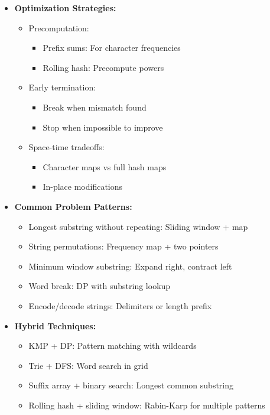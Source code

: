 \documentclass[a4paper,10pt]{book}
\begin{document}
\begin{itemize}
    \item \textbf{Optimization Strategies:}
    \begin{itemize}
        \item Precomputation:
        \begin{itemize}
            \item Prefix sums: For character frequencies
            \item Rolling hash: Precompute powers
        \end{itemize}
        \item Early termination:
        \begin{itemize}
            \item Break when mismatch found
            \item Stop when impossible to improve
        \end{itemize}
        \item Space-time tradeoffs:
        \begin{itemize}
            \item Character maps vs full hash maps
            \item In-place modifications
        \end{itemize}
    \end{itemize}
    
    \item \textbf{Common Problem Patterns:}
    \begin{itemize}
        \item Longest substring without repeating: Sliding window + map
        \item String permutations: Frequency map + two pointers
        \item Minimum window substring: Expand right, contract left
        \item Word break: DP with substring lookup
        \item Encode/decode strings: Delimiters or length prefix
    \end{itemize}
    
    \item \textbf{Hybrid Techniques:}
    \begin{itemize}
        \item KMP + DP: Pattern matching with wildcards
        \item Trie + DFS: Word search in grid
        \item Suffix array + binary search: Longest common substring
        \item Rolling hash + sliding window: Rabin-Karp for multiple patterns
    \end{itemize}
    

\end{itemize}
\end{document}
